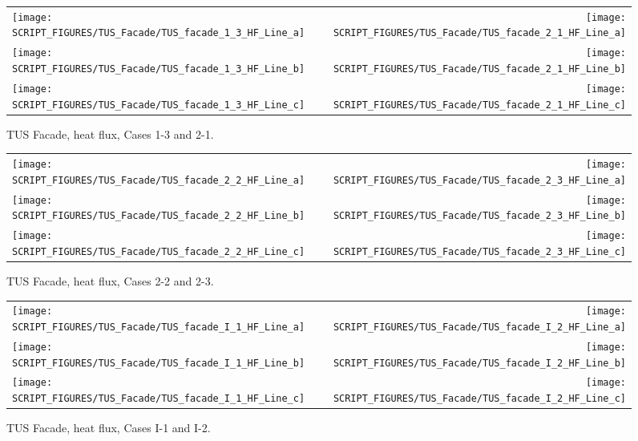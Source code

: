 \begin{figure}[p]
\begin{tabular*}{\textwidth}{l@{\extracolsep{\fill}}r}
\texttt{[image: SCRIPT\_FIGURES/TUS\_Facade/TUS\_facade\_1\_3\_HF\_Line\_a]} &
\texttt{[image: SCRIPT\_FIGURES/TUS\_Facade/TUS\_facade\_2\_1\_HF\_Line\_a]} \\
\texttt{[image: SCRIPT\_FIGURES/TUS\_Facade/TUS\_facade\_1\_3\_HF\_Line\_b]} &
\texttt{[image: SCRIPT\_FIGURES/TUS\_Facade/TUS\_facade\_2\_1\_HF\_Line\_b]} \\
\texttt{[image: SCRIPT\_FIGURES/TUS\_Facade/TUS\_facade\_1\_3\_HF\_Line\_c]} &
\texttt{[image: SCRIPT\_FIGURES/TUS\_Facade/TUS\_facade\_2\_1\_HF\_Line\_c]}
\end{tabular*}
\caption[TUS Facade, heat flux, Cases 1-3 and 2-1]{TUS Facade, heat flux, Cases 1-3 and 2-1.}
\label{TUS Facade_Heat_Flux_2}
\end{figure}

\begin{figure}[p]
\begin{tabular*}{\textwidth}{l@{\extracolsep{\fill}}r}
\texttt{[image: SCRIPT\_FIGURES/TUS\_Facade/TUS\_facade\_2\_2\_HF\_Line\_a]} &
\texttt{[image: SCRIPT\_FIGURES/TUS\_Facade/TUS\_facade\_2\_3\_HF\_Line\_a]} \\
\texttt{[image: SCRIPT\_FIGURES/TUS\_Facade/TUS\_facade\_2\_2\_HF\_Line\_b]} &
\texttt{[image: SCRIPT\_FIGURES/TUS\_Facade/TUS\_facade\_2\_3\_HF\_Line\_b]} \\
\texttt{[image: SCRIPT\_FIGURES/TUS\_Facade/TUS\_facade\_2\_2\_HF\_Line\_c]} &
\texttt{[image: SCRIPT\_FIGURES/TUS\_Facade/TUS\_facade\_2\_3\_HF\_Line\_c]}
\end{tabular*}
\caption[TUS Facade, heat flux, Cases 2-2 and 2-3]{TUS Facade, heat flux, Cases 2-2 and 2-3.}
\label{TUS Facade_Heat_Flux_3}
\end{figure}

\begin{figure}[p]
\begin{tabular*}{\textwidth}{l@{\extracolsep{\fill}}r}
\texttt{[image: SCRIPT\_FIGURES/TUS\_Facade/TUS\_facade\_I\_1\_HF\_Line\_a]} &
\texttt{[image: SCRIPT\_FIGURES/TUS\_Facade/TUS\_facade\_I\_2\_HF\_Line\_a]} \\
\texttt{[image: SCRIPT\_FIGURES/TUS\_Facade/TUS\_facade\_I\_1\_HF\_Line\_b]} &
\texttt{[image: SCRIPT\_FIGURES/TUS\_Facade/TUS\_facade\_I\_2\_HF\_Line\_b]} \\
\texttt{[image: SCRIPT\_FIGURES/TUS\_Facade/TUS\_facade\_I\_1\_HF\_Line\_c]} &
\texttt{[image: SCRIPT\_FIGURES/TUS\_Facade/TUS\_facade\_I\_2\_HF\_Line\_c]}
\end{tabular*}
\caption[TUS Facade, heat flux, Cases I-1 and I-2]{TUS Facade, heat flux, Cases I-1 and I-2.}
\label{TUS Facade_Heat_Flux_4}
\end{figure}

